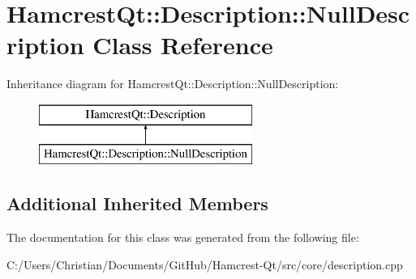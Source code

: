 \hypertarget{class_hamcrest_qt_1_1_description_1_1_null_description}{\section{Hamcrest\-Qt\-:\-:Description\-:\-:Null\-Description Class Reference}
\label{class_hamcrest_qt_1_1_description_1_1_null_description}
}
Inheritance diagram for Hamcrest\-Qt\-:\-:Description\-:\-:Null\-Description\-:\begin{figure}[H]
\begin{center}
\leavevmode
\includegraphics[height=2.000000cm]{class_hamcrest_qt_1_1_description_1_1_null_description}
\end{center}
\end{figure}
\subsection*{Additional Inherited Members}


The documentation for this class was generated from the following file\-:\begin{DoxyCompactItemize}
\item 
C\-:/\-Users/\-Christian/\-Documents/\-Git\-Hub/\-Hamcrest-\/\-Qt/src/core/description.\-cpp\end{DoxyCompactItemize}
